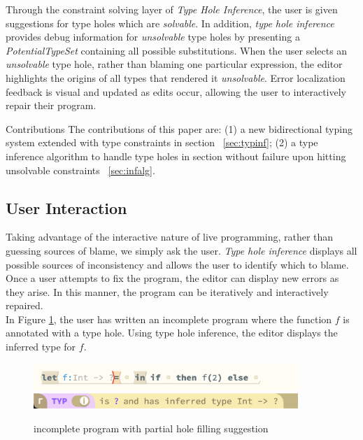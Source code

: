 Through the constraint solving layer of \emph{Type Hole Inference}, the user is given suggestions for type holes which are \textit{solvable}. In addition, \emph{type hole inference} provides debug information for \emph{unsolvable} type holes by presenting a \emph{PotentialTypeSet} containing all possible substitutions. When the user selects an \emph{unsolvable} type hole, rather than blaming one particular expression, the editor highlights the origins of all types that rendered it \emph{unsolvable}. Error localization feedback is visual and updated as edits occur, allowing the user to interactively repair their program.

\par{Contributions} The contributions of this paper are: (1) a new bidirectional typing system extended with type constraints in section ~\ref{sec:typinf}; (2) a type inference algorithm to handle type holes in section without failure upon hitting unsolvable constraints ~\ref{sec:infalg}.

\subsection{User Interaction}

Taking advantage of the interactive nature of live programming, rather than guessing sources of blame, we simply ask the user. \emph{Type hole inference} displays all possible sources of inconsistency and allows the user to identify which to blame. Once a user attempts to fix the program, the editor can display new errors as they arise. In this manner, the program can be iteratively and interactively repaired. \\

In Figure \ref{fig:editor_holes}, the user has written an incomplete program where the function $f$ is annotated with a type hole. Using type hole inference, the editor displays the inferred type for $f$.

\begin{figure}[H]
\includegraphics[width=10cm]{images/example_holes.png}
\includegraphics[width=10cm]{images/example_holes_CI.png}
\caption{incomplete program with partial hole filling suggestion}
\label{fig:editor_holes}
\end{figure}

